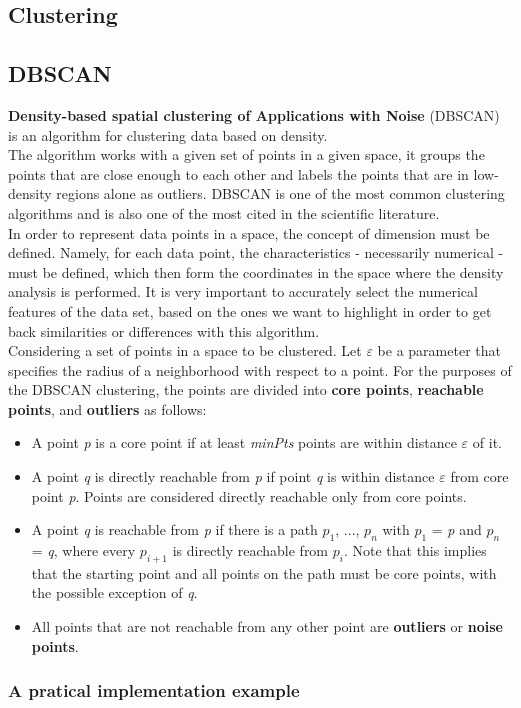     \subsection{Clustering}
    
    \subsection{DBSCAN}
    \textbf{Density-based spatial clustering of Applications with Noise} (DBSCAN) is an algorithm for clustering data based on density.
    \\
    The algorithm works with a given set of points in a given space, it groups the points that are close enough to each other and labels the points that are in low-density regions alone as outliers. DBSCAN is one of the most common clustering algorithms and is also one of the most cited in the scientific literature.
    \\
    In order to represent data points in a space, the concept of dimension must be defined. Namely, for each data point, the characteristics - necessarily numerical - must be defined, which then form the coordinates in the space where the density analysis is performed. It is very important to accurately select the numerical features of the data set, based on the ones we want to highlight in order to get back similarities or differences with this algorithm.
    \\
    Considering a set of points in a space to be clustered. Let $\varepsilon$ be a parameter that specifies the radius of a neighborhood with respect to a point.
    For the purposes of the DBSCAN clustering, the points are divided into \textbf{core points}, \textbf{reachable points}, and \textbf{outliers} as follows:
        
    \begin{itemize}
    \item A point \textit{p} is a core point if at least \textit{minPts} points are within distance $\varepsilon$ of it.
    \item A point \textit{q} is directly reachable from \textit{p} if point \textit{q} is within distance $\varepsilon$ from core point \textit{p}. Points are considered directly reachable only from core points.
    \item A point \textit{q} is reachable from \textit{p} if there is a path \textit{$p_1$}, ..., \textit{$p_n$} with \textit{$p_1$} = \textit{p} and \textit{$p_n$} = \textit{q}, where every \textit{$p_{i+1}$} is directly reachable from \textit{$p_i$}. Note that this implies that the starting point and all points on the path must be core points, with the possible exception of \textit{q}.
    \item All points that are not reachable from any other point are \textbf{outliers} or \textbf{noise points}.
    \end{itemize}
    
    
    \subsubsection{A pratical implementation example}
    